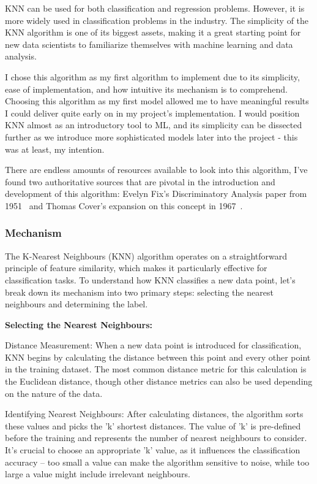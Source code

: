 \documentclass[letterpaper,10pt]{article}
\begin{document}
KNN can be used for both classification and regression problems. However, it is more widely used in classification problems in the industry. The simplicity of the KNN algorithm is one of its biggest assets, making it a great starting point for new data scientists to familiarize themselves with machine learning and data analysis. \par
I chose this algorithm as my first algorithm to implement due to its simplicity, ease of implementation, and how intuitive its mechanism is to comprehend. Choosing this algorithm as my first model allowed me to have meaningful results I could deliver quite early on in my project's implementation. I would position KNN almost as an introductory tool to ML, and its simplicity can be dissected further as we introduce more sophisticated models later into the project - this was at least, my intention. \par
There are endless amounts of resources available to look into this algorithm, I've found two authoritative sources that are pivotal in the introduction and development of this algorithm: Evelyn Fix's Discriminatory Analysis paper from 1951~\cite{NNEFixHodges} and Thomas Cover's expansion on this concept in 1967~\cite{NNCoverHart}.

\subsubsection{Mechanism}
The K-Nearest Neighbours (KNN) algorithm operates on a straightforward principle of feature similarity, which makes it particularly effective for classification tasks. To understand how KNN classifies a new data point, let's break down its mechanism into two primary steps: selecting the nearest neighbours and determining the label. \par

\textbf{Selecting the Nearest Neighbours:}

Distance Measurement: When a new data point is introduced for classification, KNN begins by calculating the distance between this point and every other point in the training dataset. The most common distance metric for this calculation is the Euclidean distance, though other distance metrics can also be used depending on the nature of the data.

Identifying Nearest Neighbours: After calculating distances, the algorithm sorts these values and picks the 'k' shortest distances. The value of 'k' is pre-defined before the training and represents the number of nearest neighbours to consider. It's crucial to choose an appropriate 'k' value, as it influences the classification accuracy – too small a value can make the algorithm sensitive to noise, while too large a value might include irrelevant neighbours.
\end{document}
